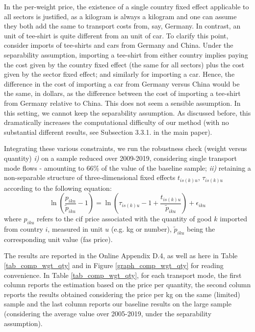 \documentclass[a4paper,11pt]{article}
\begin{document}
In the per-weight price, the existence of a single country fixed effect applicable to all sectors is justified, as a kilogram is always a kilogram and one can assume they both add the same to transport costs from, say, Germany. In contrast, an unit of tee-shirt is quite different from an unit of car. To clarify this point, consider imports of tee-shirts and cars from
Germany and China. Under the separability assumption, importing a tee-shirt from either country implies paying the cost given by the country fixed effect (the same for all sectors) plus the cost given by
the sector fixed effect; and similarly for importing a car.
Hence, the difference in the cost of importing a car from Germany versus China would be the same, in dollars, as the difference between the cost of importing a tee-shirt from Germany relative to China. This does not seem a sensible assumption.
In this setting, we cannot keep the separability assumption.
As discussed before, this dramatically increases the computational difficulty of our method (with no substantial different results, see Subsection 3.3.1. in the main paper).\smallskip

Integrating these various constraints, we run the robustness check (weight versus quantity) \textit{i)} on a sample reduced over 2009-2019, considering single transport mode flows - amounting to 66\% of the value of the baseline sample; \textit{ii)} retaining a non-separable structure of three-dimensional fixed effects $t_{is(k)u}$, $\tau_{is(k)u}$ according to the following equation:
\begin{equation*}
\ln\left(\frac{p_{iku}}{\widetilde{p}_{iku}}-1 \right)= \ln \left(\tau_{is(k)u} -1+\frac{t_{is(k)u} }{\widetilde{p}_{iku}} \right) + \epsilon_{iku}
\end{equation*}
\noindent where $p_{iku}$ refers to the cif price associated with the quantity of good $k$ imported from country $i$, measured in unit $u$ (e.g. kg or number), $\widetilde{p}_{iku}$ being the corresponding unit value (fas price).

The results are reported in the Online Appendix D.4, as well as here in Table \ref{tab_comp_wgt_qty} and in Figure \ref{graph_comp_wgt_qty} for reading convenience. In Table \ref{tab_comp_wgt_qty}, for each transport mode, the first column reports the estimation based on the price per quantity, the second column reports the results obtained considering the price per kg on the same (limited) sample and the last column reports our baseline results on the large sample (considering the average value over 2005-2019, under the separability assumption).
\end{document}
